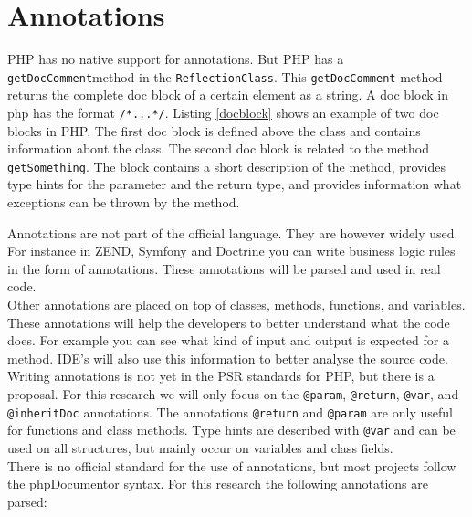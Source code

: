 \documentclass[../main.tex]{subfiles}
\begin{document}
    \section{Annotations}\label{sec:background_annotations}
    PHP has no native support for annotations.
    But PHP has a \texttt{getDocComment}\footnotemark method in the \texttt{ReflectionClass}. 
    This \texttt{getDocComment} method returns the complete doc block of a certain element as a string.
    A doc block in php has the format \texttt{\slash**...*\slash}.
    Listing \ref{docblock} shows an example of two doc blocks in PHP.
    The first doc block is defined above the class and contains information about the class.
    The second doc block is related to the method \texttt{getSomething}. 
    The block contains a short description of the method, provides type hints for the parameter and the return type, and provides information what exceptions can be thrown by the method. 
    
    
    

    Annotations are not part of the official language.
    They are however widely used. 
    For instance in ZEND, Symfony and Doctrine you can write business logic rules in the form of annotations.
    These annotations will be parsed and used in real code.
    \\
    Other annotations are placed on top of classes, methods, functions, and variables.
    These annotations will help the developers to better understand what the code does. 
    For example you can see what kind of input and output is expected for a method.
    IDE's will also use this information to better analyse the source code.
    \\
    Writing annotations is not yet in the PSR standards for PHP, but there is a proposal\footnotemark.
    For this research we will only focus on the \texttt{@param}, \texttt{@return}, \texttt{@var}, and \texttt{@inheritDoc} annotations.
    The annotations \texttt{@return} and \texttt{@param} are only useful for functions and class methods. Type hints are described with \texttt{@var} and can be used on all structures, but mainly occur on variables and class fields.
    \\
    There is no official standard for the use of annotations, but most projects follow the phpDocumentor syntax.
    For this research the following annotations are parsed:
    
\end{document}

